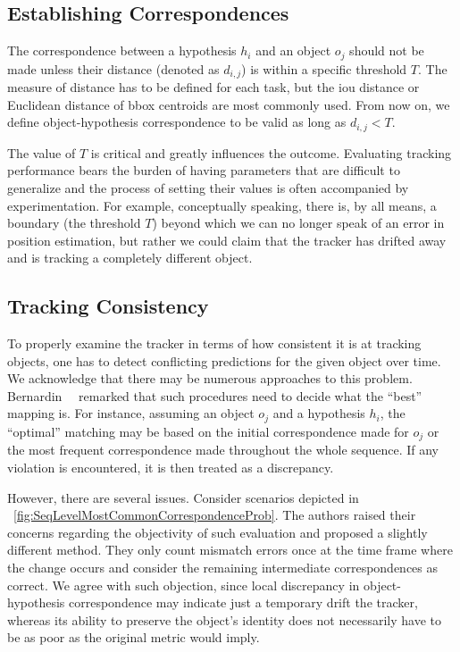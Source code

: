 \subsection{Establishing Correspondences}

The correspondence between a hypothesis $h_i$ and an object $o_j$ should not be made unless their distance (denoted as $d_{i,j}$) is within a specific threshold $T$. The measure of distance has to be defined for each task, but the \gls{iou} distance or Euclidean distance of \gls{bbox} centroids are most commonly used. From now on, we define object-hypothesis correspondence to be valid as long as $d_{i,j} < T$.

The value of $T$ is critical and greatly influences the outcome. Evaluating tracking performance bears the burden of having parameters that are difficult to generalize and the process of setting their values is often accompanied by experimentation. For example, conceptually speaking, there is, by all means, a boundary (the threshold $T$) beyond which we can no longer speak of an error in position estimation, but rather we could claim that the tracker has drifted away and is tracking a completely different object.

\subsection{Tracking Consistency}

To properly examine the tracker in terms of how consistent it is at tracking objects, one has to detect conflicting predictions for the given object over time. We acknowledge that there may be numerous approaches to this problem. Bernardin~\etal{}~\cite{bernardin2008clearmot} remarked that such procedures need to decide what the ``best'' mapping is. For instance, assuming an object $o_j$ and a hypothesis $h_i$, the ``optimal'' matching may be based on the initial correspondence made for $o_j$ or the most frequent correspondence made throughout the whole sequence. If any violation is encountered, it is then treated as a discrepancy.

However, there are several issues. Consider scenarios depicted in \figtext{}~\ref{fig:SeqLevelMostCommonCorrespondenceProb}. The authors raised their concerns regarding the objectivity of such evaluation and proposed a slightly different method. They only count mismatch errors once at the time frame where the change occurs and consider the remaining intermediate correspondences as correct. We agree with such objection, since local discrepancy in object-hypothesis correspondence may indicate just a temporary drift the tracker, whereas its ability to preserve the object's identity does not necessarily have to be as poor as the original metric would imply.

